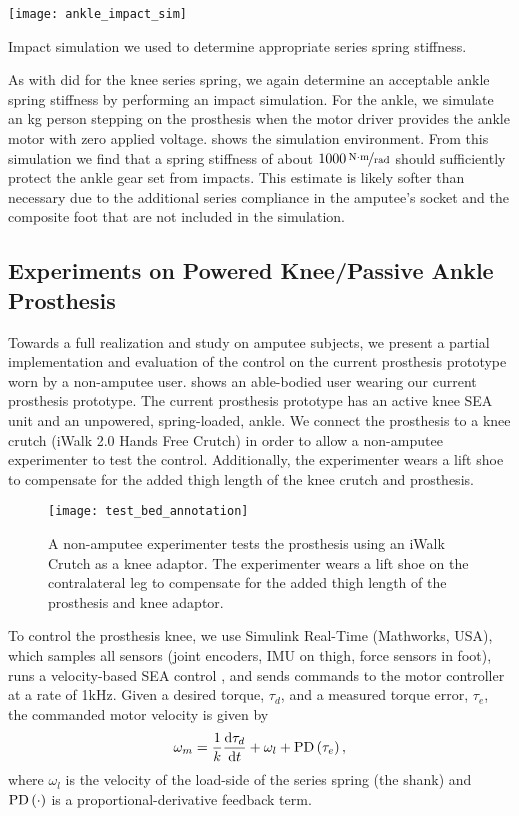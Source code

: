 \begin{marginfigure}[-0.0in]
    \centering 
    \texttt{[image: ankle\_impact\_sim]}
    \caption{Impact simulation we used to determine appropriate series spring
    stiffness.}\label{fig:ankle_impact_sim}
\end{marginfigure}
As with did for the knee series spring, we again determine an acceptable ankle
spring stiffness by performing an impact simulation. For the ankle, we simulate
an \unit[80]{kg} person stepping on the prosthesis when the motor driver
provides the ankle motor with zero applied voltage. 
shows the simulation environment. From this simulation we find that a spring
stiffness of about $\unitfrac[1000]{N \cdot m}{rad}$ should sufficiently protect
the ankle gear set from impacts. This estimate is likely softer than necessary
due to the additional series compliance in the amputee's socket and the
composite foot that are not included in the simulation.

\subsection{Experiments on Powered Knee/Passive Ankle Prosthesis}
Towards a full realization and study on amputee subjects, we present a partial
implementation and evaluation of the control on the current prosthesis prototype
worn by a non-amputee user.  shows an able-bodied
user wearing our current prosthesis prototype. The current prosthesis prototype
has an active knee SEA unit and an unpowered, spring-loaded, ankle.  We connect
the prosthesis to a knee crutch (iWalk 2.0 Hands Free Crutch) in order to allow
a non-amputee experimenter to test the control. Additionally, the experimenter
wears a lift shoe to compensate for the added thigh length of the knee crutch
and prosthesis.
\begin{figure}
    \centering 
    \texttt{[image: test\_bed\_annotation]}
    \caption{A non-amputee experimenter tests the prosthesis using an iWalk
    Crutch as a knee adaptor. The experimenter wears a lift shoe on the
    contralateral leg to compensate for the added thigh length of the prosthesis
    and knee adaptor.
    }\label{fig:test_bed_annotation}
\end{figure}

To control the prosthesis knee, we use Simulink Real-Time (Mathworks, USA),
which samples all sensors (joint encoders, IMU on thigh, force sensors in foot),
runs a velocity-based SEA control \citep{schepelmann2012development}, and sends
commands to the motor controller at a rate of 1kHz. Given a desired torque,
$\tau_d$, and a measured torque error, $\tau_e$, the commanded motor velocity is
given by
\begin{align}
    \omega_m = \frac{1}{k} \frac{\tn{d} \tau_d}{\tn{d} t} + \omega_l 
        + \func{PD}{\tau_e},
\end{align}
where $\omega_l$ is the velocity of the load-side of the series spring (the
shank) and $\func{PD}{\cdot}$ is a proportional-derivative feedback term. 


